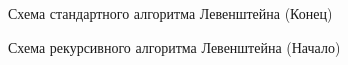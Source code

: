 \documentclass[a4paper,12pt]{article}
\begin{document}
\begin{figure}[p]
\caption{Схема стандартного алгоритма Левенштейна (Конец)}
\label{images:levenstein2}
\end{figure}

\begin{figure}[p]
\caption{Схема рекурсивного алгоритма Левенштейна (Начало)}
\label{images:recursive_levenstein}
\end{figure}
\end{document}
